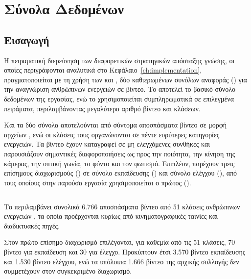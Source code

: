 \chapter{Σύνολα Δεδομένων}
\label{ch:datasets}

\section{Εισαγωγή}
\label{sec:datasets-introduction}

Η πειραματική διερεύνηση των διαφορετικών στρατηγικών απόσταξης γνώσης,
οι οποίες περιγράφονται αναλυτικά στο Κεφάλαιο~\ref{ch:implementation},
πραγματοποιείται με τη χρήση των  και , δύο
καθιερωμένων συνόλων αναφοράς () για την αναγνώριση
ανθρώπινων ενεργειών σε βίντεο. Το  αποτελεί το βασικό
σύνολο δεδομένων της εργασίας, ενώ το  χρησιμοποιείται
συμπληρωματικά σε επιλεγμένα πειράματα, περιλαμβάνοντας μεγαλύτερο
αριθμό βίντεο και κλάσεων.

Και τα δύο σύνολα αποτελούνται από σύντομα αποσπάσματα βίντεο σε μορφή
αρχείων , ενώ οι κλάσεις τους οργανώνονται σε πέντε ευρύτερες
κατηγορίες ενεργειών. Τα βίντεο έχουν καταγραφεί σε μη ελεγχόμενες
συνθήκες και παρουσιάζουν σημαντικές διαφοροποιήσεις ως προς την
ποιότητα, την κίνηση της κάμερας, την οπτική γωνία, το φόντο και τον
φωτισμό. Επιπλέον, παρέχουν τρεις επίσημους διαχωρισμούς ()
σε σύνολο εκπαίδευσης () και σύνολο ελέγχου
(), από τους οποίους στην παρούσα εργασία χρησιμοποιείται ο
πρώτος ().

\section{}
\label{sec:hmdb51-dataset}

Το  περιλαμβάνει συνολικά 6.766 αποσπάσματα βίντεο από
51 κλάσεις ανθρώπινων ενεργειών \cite{kuehne2011hmdb}, τα οποία
προέρχονται κυρίως από κινηματογραφικές ταινίες και διαδικτυακές πηγές.

Στον πρώτο επίσημο διαχωρισμό επιλέγονται, για καθεμία από τις 51
κλάσεις, 70 βίντεο για εκπαίδευση και 30 για έλεγχο. Προκύπτουν έτσι
3.570 βίντεο εκπαίδευσης και 1.530 βίντεο ελέγχου, ενώ τα υπόλοιπα
1.666 βίντεο της αρχικής συλλογής δεν συμμετέχουν στον συγκεκριμένο
διαχωρισμό.

\section{}
\label{sec:ucf101-dataset}

